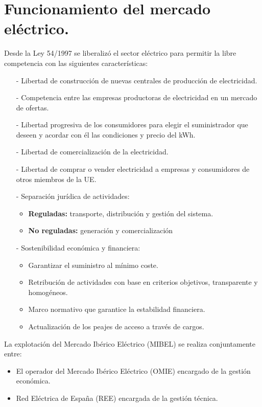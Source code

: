 \section{Funcionamiento del mercado eléctrico.}
Desde la Ley 54/1997 se liberalizó el sector eléctrico para permitir la libre competencia con las siguientes características:
\begin{itemize}
	\item [-] Libertad de construcción de nuevas centrales de producción de electricidad.
	\item [-] Competencia entre las empresas productoras de electricidad en un mercado de ofertas.
	\item [-] Libertad progresiva de los consumidores para elegir el suministrador que deseen y acordar con
	él las condiciones y precio del kWh.
	\item [-] Libertad de comercialización de la electricidad.
	\item [-] Libertad de comprar o vender electricidad a empresas y consumidores de otros miembros de
	la UE.
	\item [-] Separación jurídica de actividades:
	\begin{itemize}
		\item \textbf{Reguladas:} transporte, distribución y gestión del sistema.
		\item \textbf{No reguladas:} generación y comercialización
	\end{itemize}
	\item [-] Sostenibilidad económica y financiera:
	\begin{itemize}
		\item Garantizar el suministro al mínimo coste.
		\item Retribución de actividades con base en criterios objetivos, transparente y homogéneos.
		\item Marco normativo que garantice la estabilidad financiera.
		\item  Actualización de los peajes de acceso a través de cargos.
	\end{itemize}
\end{itemize}
La explotación del Mercado Ibérico Eléctrico (MIBEL) se realiza conjuntamente entre:
\begin{itemize}
	\item El operador del Mercado Ibérico Eléctrico (OMIE) encargado de la gestión económica.
	\item Red Eléctrica de España (REE) encargada de la gestión técnica.
\end{itemize}
